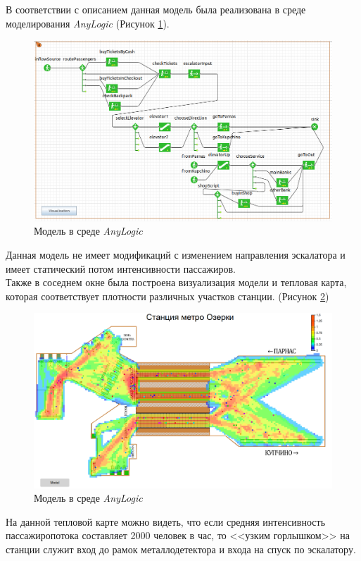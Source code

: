 \documentclass[14pt,fleqn]{extarticle}
\begin{document}
	В соответствии с описанием данная модель была реализована в среде моделирования \textit{AnyLogic} (Рисунок \ref{fig:metro_anylogic_model}).
	
	\begin{figure}[h]
		\centering \includegraphics[scale=0.3]{metro_anylogic_model}
		\caption{Модель в среде \textit{AnyLogic}}
		\label{fig:metro_anylogic_model}
	\end{figure}

	Данная модель не имеет модификаций с изменением направления эскалатора и имеет статический потом интенсивности пассажиров.\\
	
	Также в соседнем окне была построена визуализация модели и тепловая карта, которая соответствует плотности различных участков станции. (Рисунок \ref{fig:metro_visualization})
	
	\begin{figure}[h]
		\centering \includegraphics[scale=0.24]{metro_visualization}
		\caption{Модель в среде \textit{AnyLogic}}
		\label{fig:metro_visualization}
	\end{figure}

	\newpage
	
	На данной тепловой карте можно видеть, что если средняя интенсивность пассажиропотока составляет 2000 человек в час, то <<узким горлышком>> на станции служит вход до рамок металлодетектора и входа на спуск по эскалатору.
\end{document}
